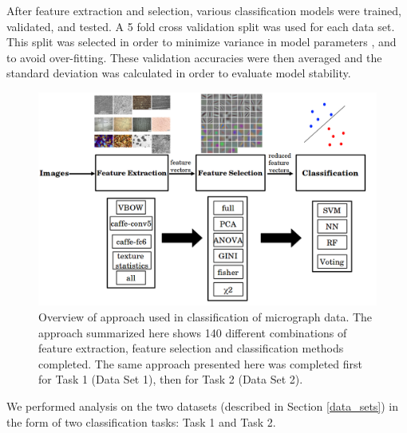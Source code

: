 After feature extraction and selection, various classification models were trained, validated, and tested.  A 5 fold cross validation split was used for each data set.  This split was selected in order to minimize variance in model parameters%
, and to avoid over-fitting.  These validation accuracies were then averaged and the standard deviation was calculated in order to evaluate model stability.  
%
\begin{figure}
  \begin{centering}
 \includegraphics[scale=0.4]{img/flowchart_approach_updated.png}
 \caption{Overview of approach used in classification of micrograph data.  The approach summarized here shows 140 different combinations of feature extraction, feature selection and classification methods completed.  The same approach presented here was completed first for Task 1 (Data Set 1), then for Task 2 (Data Set 2).}
 \label{fig:approach_overview}
 \end{centering}
\end{figure}
%
We performed analysis on the two datasets (described in Section \ref{data_sets}) in the form of two classification tasks: Task 1 and Task 2. 



